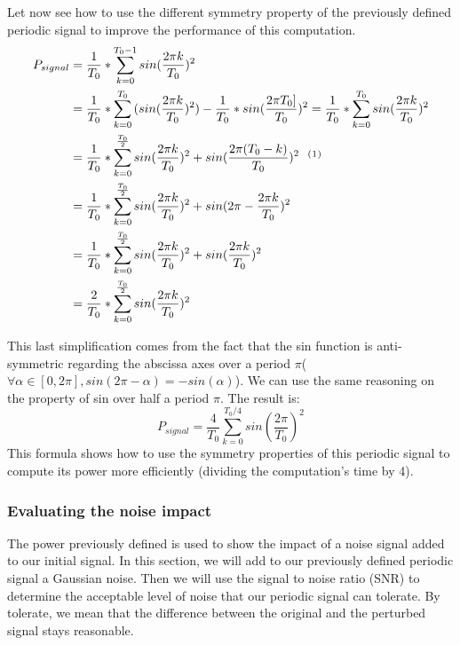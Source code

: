 \documentclass[a4paper]{article}
\begin{document}
Let now see how to use the different symmetry property of the previously defined periodic signal to improve the performance of this computation.
\begin{equation*}
\begin{aligned}
	P_{signal}	&= \frac{1}{T_{0}} * \sum_{k=0}^{T_{0}-1}{sin(\frac{2 \pi k}{T_{0}})^2} \\ 
				&= \frac{1}{T_{0}} * \sum_{k=0}^{T_{0}}{(sin(\frac{2 \pi k}{T_{0}})^2)} - \frac{1}{T_{0}} * sin(\frac{2 \pi T_{0}]}{T_{0}})^2
                = \frac{1}{T_{0}} * \sum_{k=0}^{T_{0}}{sin(\frac{2 \pi k}{T_{0}})^2}\\
                &= \frac{1}{T_{0}} * \sum_{k=0}^{\frac{T_{0}}{2}}{sin(\frac{2 \pi k}{T_{0}})^2 + sin(\frac{2 \pi (T_{0}-k)}{T_{0}})^2} \mbox{\space \space $^($\footnotemark[1]$^)$}\\
                &= \frac{1}{T_{0}} * \sum_{k=0}^{\frac{T_{0}}{2}}{sin(\frac{2 \pi k}{T_{0}})^2 + sin(2\pi - \frac{2 \pi k}{T_{0}})^2}\\
                &= \frac{1}{T_{0}} * \sum_{k=0}^{\frac{T_{0}}{2}}{sin(\frac{2 \pi k}{T_{0}})^2 + sin(\frac{2 \pi k}{T_{0}})^2} \\
                &= \frac{2}{T_{0}} * \sum_{k=0}^{\frac{T_{0}}{2}}{sin(\frac{2 \pi k}{T_{0}})^2}
\end{aligned}
\end{equation*}


This last simplification comes from the fact that the sin function is anti-symmetric regarding the abscissa axes over a period $\pi$($\forall \alpha \in [0, 2\pi], sin(2\pi - \alpha) = -sin(\alpha)$).   We can use the same reasoning on the property of sin over half a period $\pi$.  The result is:
\begin{equation*}
	P_{signal} = \frac{4}{T_{0}} \sum_{k=0}^{T_{0}/4}{sin(\frac{2\pi}{T_{0}})^2}
\end{equation*}
This formula shows how to use the symmetry properties of this periodic signal to compute its power more efficiently (dividing the computation's time by 4).





\subsubsection{Evaluating the noise impact}
The power previously defined is used to show the impact of a noise signal added to our initial signal.   In this section, we will add to our previously defined periodic signal a Gaussian noise. Then we will use the signal to noise ratio (SNR) to determine the acceptable level of noise that our periodic signal can tolerate.   By tolerate, we mean that the difference between the original and the perturbed signal stays reasonable.\\
\end{document}
